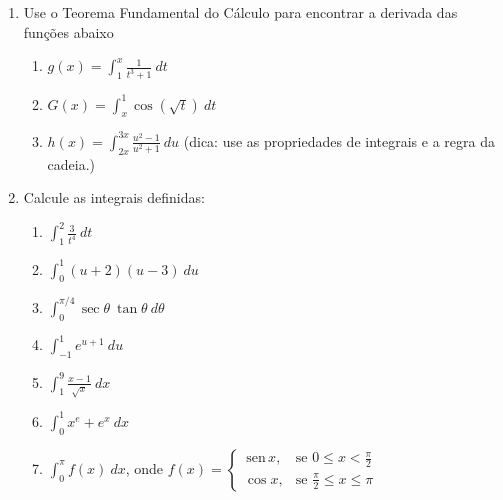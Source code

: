 \documentclass[a4paper,5pt]{amsbook}
\newcommand{\sen}{\,\mbox{sen}\,}
\newcommand{\ds}{\displaystyle}
\begin{document}
\begin{enumerate}


    \vspace{0.5cm}
    \item Use o Teorema Fundamental do C\'alculo para encontrar a derivada das
    	fun\c{c}\~oes abaixo
    \begin{enumerate}
    	\item $\displaystyle g(x) = \int_1^x \frac{1}{t^3 + 1}\ dt$
    	\item $\displaystyle G(x) = \int_x^1 \cos(\sqrt{t})\ dt$
        \item $\displaystyle h(x) = \int_{2x}^{3x} \frac{u^2 - 1}{u^2 + 1}\ du$
            (dica: use as propriedades de integrais e a regra da cadeia.)
    \end{enumerate}

    \newpage
    \vspace{0.5cm}
    \item Calcule as integrais definidas:
    \begin{enumerate}
    	\item $\displaystyle\int_1^2 \frac{3}{t^4}\ dt$
        \vspace{0.3cm}
        \item $\ds\int_0^1 (u+2)(u-3)\ du$
        \vspace{0.3cm}
    	\item $\displaystyle\int_0^{\pi/4} \sec\theta\ \tan\theta\ d\theta$
        \vspace{0.3cm}
    	\item $\displaystyle\int_{-1}^1 e^{u+1}\ du$
        \vspace{0.3cm}
        \item $\ds\int_1^9 \frac{x-1}{\sqrt{x}}\ dx$
        \vspace{0.3cm}
    	\item $\displaystyle\int_0^1 x^e + e^x\ dx$
        \vspace{0.3cm}
    	\item $\displaystyle\int_0^{\pi} f(x)\ dx$, onde $f(x) = \left\{
    			\begin{array}{rl}
    				\sen x, & \mbox{se } 0 \le x < \frac{\pi}{2} \\
    				\cos x, & \mbox{se } \frac{\pi}{2} \le x \le \pi
    			\end{array}\right.$
    \end{enumerate}


\end{enumerate}
\end{document}
